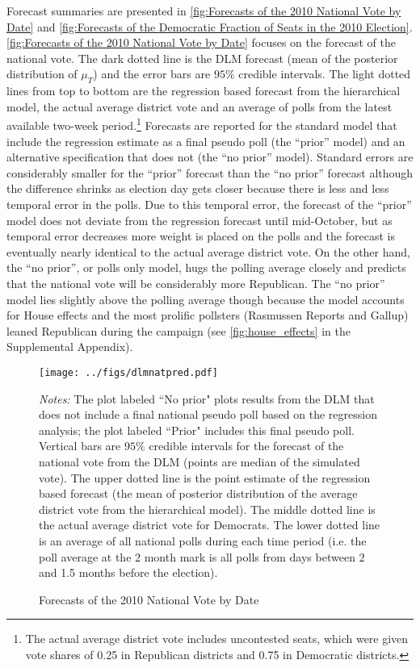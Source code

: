 \documentclass[12pt,final,fleqn]{article}
\theoremstyle{plain}
\begin{document}
Forecast summaries are presented in \autoref{fig:Forecasts of the 2010 National Vote by Date} and \autoref{fig:Forecasts of the Democratic Fraction of Seats in the 2010 Election}. \autoref{fig:Forecasts of the 2010 National Vote by Date} focuses on the forecast of the national vote. The dark dotted line is the DLM forecast (mean of the posterior distribution of $\mu_T$) and the error bars are $95\%$ credible intervals. The light dotted lines from top to bottom are the regression based forecast from the hierarchical model, the actual average district vote and an average of polls from the latest available two-week period.\footnote{The actual average district vote includes uncontested seats, which were given vote shares of 0.25 in Republican districts and 0.75 in Democratic districts.} Forecasts are reported for the standard model that include the regression estimate as a final pseudo poll (the ``prior'' model) and an alternative specification that does not (the ``no prior'' model). Standard errors are considerably smaller for the ``prior'' forecast than the ``no prior'' forecast although the difference shrinks as election day gets closer because there is less and less temporal error in the polls. Due to this temporal error, the forecast of the ``prior'' model does not deviate from the regression forecast until mid-October, but as temporal error decreases more weight is placed on the polls and the forecast is eventually nearly identical to the actual average district vote. On the other hand, the ``no prior'', or polls only model, hugs the polling average closely and predicts that the national vote will be considerably more Republican. The ``no prior'' model lies slightly above the polling average though because the model accounts for House effects and the most prolific pollsters (Rasmussen Reports and Gallup) leaned Republican during the campaign (see \autoref*{fig:house_effects} in the Supplemental Appendix). 

\begin{figure}[!htb]
\centering
\texttt{[image: ../figs/dlmnatpred.pdf]}
\vspace{.5cm}
\caption{Forecasts of the 2010 National Vote by Date}
\label{fig:Forecasts of the 2010 National Vote by Date}
\begin{minipage}{\linewidth}
\footnotesize
\emph{Notes:} The plot labeled ``No prior" plots results from the DLM that does not include a final national pseudo poll based on the regression analysis; the plot labeled ``Prior" includes this final pseudo poll. Vertical bars are $95\%$ credible intervals for the forecast of the national vote from the DLM (points are median of the simulated vote). The upper dotted line is the point estimate of the regression based forecast (the mean of posterior distribution of the average district vote from the hierarchical model). The middle dotted line is the actual average district vote for Democrats. The lower dotted line is an average of all national polls during each time period (i.e. the poll average at the 2 month mark is all polls from days between 2 and 1.5 months before the election).
\end{minipage}
\end{figure}
\end{document}
